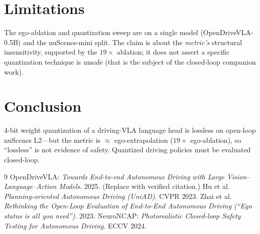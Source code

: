 \documentclass[conference]{IEEEtran}
\begin{document}
\section{Limitations}
The ego-ablation and quantization sweep are on a single model (OpenDriveVLA-0.5B) and the
nuScenes-mini split. The claim is about the \emph{metric's} structural insensitivity, supported by
the $19\times$ ablation; it does not assert a specific quantization technique is unsafe (that is the
subject of the closed-loop companion work).

\section{Conclusion}
4-bit weight quantization of a driving-VLA language head is lossless on open-loop nuScenes L2---but
the metric is $\approx$ ego-extrapolation ($19\times$ ego-ablation), so ``lossless'' is not evidence
of safety. Quantized driving policies must be evaluated closed-loop.

\begin{thebibliography}{9}
 OpenDriveVLA: \emph{Towards End-to-end Autonomous Driving with Large
Vision--Language--Action Models}. 2025. (Replace with verified citation.)
 Hu et al. \emph{Planning-oriented Autonomous Driving (UniAD)}. CVPR 2023.
 Zhai et al. \emph{Rethinking the Open-Loop Evaluation of End-to-End Autonomous
Driving (``Ego status is all you need'')}. 2023.
 NeuroNCAP: \emph{Photorealistic Closed-loop Safety Testing for Autonomous
Driving}. ECCV 2024.
\end{thebibliography}
\end{document}
